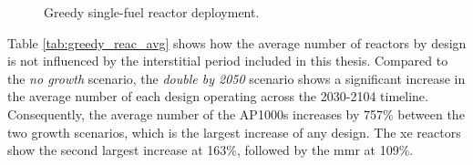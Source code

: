 \begin{figure}[H]
  \hfill
  \caption{Greedy single-fuel reactor deployment.}
  \label{fig:greedy_of_reactors}
\end{figure}

Table \ref{tab:greedy_reac_avg} shows how the average number of reactors by design is not influenced by the interstitial period included in this thesis. Compared to the \textit{no growth} scenario, the \textit{double by 2050} scenario shows a significant increase in the average number of each design operating across the 2030-2104 timeline. Consequently, the average number of the AP1000s increases by 757\% between the two growth scenarios, which is the largest increase of any design. The \gls{xe} reactors show the second largest increase at 163\%, followed by the \gls{mmr} at 109\%.

